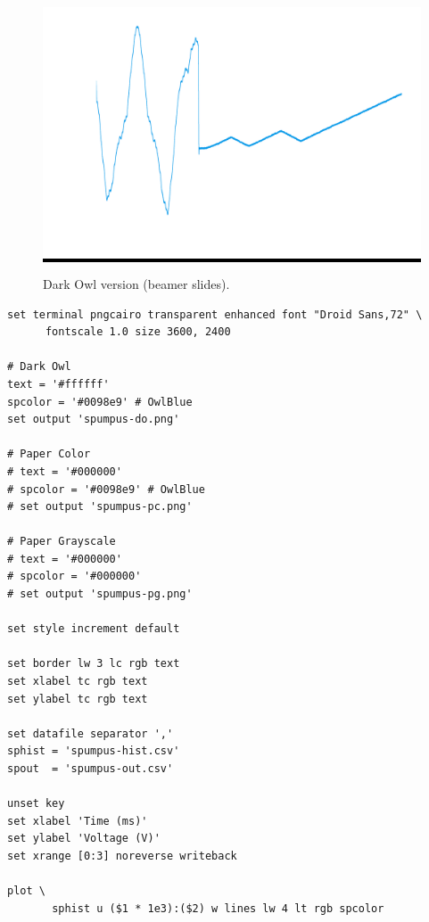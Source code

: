 \documentclass[11pt,letterpaper]{article}
\begin{document}
\begin{figure}[H]
  \centering
  \colorbox{black}{%
    \includegraphics[width=\linewidth]{../spumpus-do.png}
  }
  \caption{Dark Owl version (beamer slides).}
\end{figure}

\begin{verbatim}
set terminal pngcairo transparent enhanced font "Droid Sans,72" \
      fontscale 1.0 size 3600, 2400

# Dark Owl
text = '#ffffff'
spcolor = '#0098e9' # OwlBlue
set output 'spumpus-do.png'

# Paper Color
# text = '#000000'
# spcolor = '#0098e9' # OwlBlue
# set output 'spumpus-pc.png'

# Paper Grayscale
# text = '#000000'
# spcolor = '#000000'
# set output 'spumpus-pg.png'

set style increment default

set border lw 3 lc rgb text
set xlabel tc rgb text
set ylabel tc rgb text

set datafile separator ','
sphist = 'spumpus-hist.csv'
spout  = 'spumpus-out.csv'

unset key
set xlabel 'Time (ms)'
set ylabel 'Voltage (V)'
set xrange [0:3] noreverse writeback

plot \
       sphist u ($1 * 1e3):($2) w lines lw 4 lt rgb spcolor

\end{verbatim}
\end{document}
